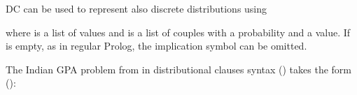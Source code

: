 \documentclass[letterpaper,10pt,english]{sphinxmanual}
\begin{document}
\sphinxAtStartPar
DC can be used to represent also discrete distributions using

\begin{sphinxVerbatim}[commandchars=\\\{\}]
  
  
\end{sphinxVerbatim}

\sphinxAtStartPar
where  is a list of values and  is a list of couples  with  a probability and  a value.
If  is empty, as in regular Prolog, the implication symbol \sphinxcode{\sphinxupquote{:=}} can be omitted.

\sphinxAtStartPar
The Indian GPA problem from  in distributional clauses syntax
() takes the form ():
\end{document}
